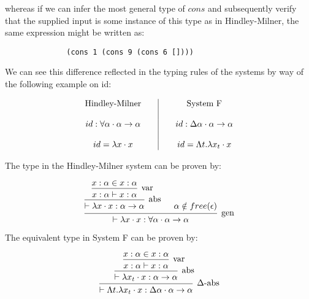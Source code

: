 \documentclass{ProgressReport}[2020/09/15]
\begin{document}
            whereas if we can infer the most general type of $cons$ and
            subsequently verify that the supplied input is some instance of this
            type as in Hindley-Milner, the same expression might be written as:
            
            \begin{verbatim}
              (cons 1 (cons 9 (cons 6 [])))  
            \end{verbatim}
            
            We can see this difference reflected in the typing rules of the
            systems by way of the following example on id:
            
            \[\begin{array}{c@{\qquad}|@{\qquad}c}
                  \mbox{Hindley-Milner}
                  &
                  \mbox{System F}
                  \\\\
                  id : \forall \alpha \cdot \alpha \to \alpha
                  &
                  id : \Delta \alpha \cdot \alpha \to \alpha
                  \\\\
                  id = \lambda x \cdot x
                  &
                  id = \Lambda t . \lambda x_t \cdot x
            \end{array} \]
            
            The type in the Hindley-Milner system can be proven by:
            
            
            \[\begin{array}{c}
            \mbox{\begin{prooftree}
                    \hypo{x : \alpha \in x : \alpha}   
                  \infer1[var]{x : \alpha \vdash x : \alpha}
                \infer1[abs]{\vdash \lambda x \cdot x : \alpha \to \alpha}
                \hypo{\alpha \notin free(\epsilon)}
               \infer2[gen]{\vdash \lambda x \cdot x : \forall \alpha \cdot
               \alpha \to \alpha}
            \end{prooftree}}
            \end{array} \]
            
            
            The equivalent type in System F can be proven by:
            
            \[\begin{array}{c}
            \mbox{\begin{prooftree}
                  \hypo{x : \alpha \in x : \alpha}
                \infer1[var]{x : \alpha \vdash x : \alpha}
               \infer1[abs]{\vdash \lambda x_t \cdot x : \alpha \to \alpha}
               \infer1[$\Delta$-abs]{\vdash \Lambda t . \lambda x_t \cdot
                 x : \Delta \alpha \cdot \alpha \to \alpha}
            \end{prooftree}}
            \end{array} \]
            
\end{document}
